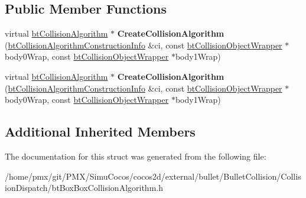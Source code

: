\subsection*{Public Member Functions}
\begin{DoxyCompactItemize}
\item 
\mbox{\label{structbtBoxBoxCollisionAlgorithm_1_1CreateFunc_a4fdd39591ef0d49a251b648b39a0c4bf}} 
virtual \hyperlink{classbtCollisionAlgorithm}{bt\+Collision\+Algorithm} $\ast$ {\bfseries Create\+Collision\+Algorithm} (\hyperlink{structbtCollisionAlgorithmConstructionInfo}{bt\+Collision\+Algorithm\+Construction\+Info} \&ci, const \hyperlink{structbtCollisionObjectWrapper}{bt\+Collision\+Object\+Wrapper} $\ast$body0\+Wrap, const \hyperlink{structbtCollisionObjectWrapper}{bt\+Collision\+Object\+Wrapper} $\ast$body1\+Wrap)
\item 
\mbox{\label{structbtBoxBoxCollisionAlgorithm_1_1CreateFunc_a4fdd39591ef0d49a251b648b39a0c4bf}} 
virtual \hyperlink{classbtCollisionAlgorithm}{bt\+Collision\+Algorithm} $\ast$ {\bfseries Create\+Collision\+Algorithm} (\hyperlink{structbtCollisionAlgorithmConstructionInfo}{bt\+Collision\+Algorithm\+Construction\+Info} \&ci, const \hyperlink{structbtCollisionObjectWrapper}{bt\+Collision\+Object\+Wrapper} $\ast$body0\+Wrap, const \hyperlink{structbtCollisionObjectWrapper}{bt\+Collision\+Object\+Wrapper} $\ast$body1\+Wrap)
\end{DoxyCompactItemize}
\subsection*{Additional Inherited Members}


The documentation for this struct was generated from the following file\+:\begin{DoxyCompactItemize}
\item 
/home/pmx/git/\+P\+M\+X/\+Simu\+Cocos/cocos2d/external/bullet/\+Bullet\+Collision/\+Collision\+Dispatch/bt\+Box\+Box\+Collision\+Algorithm.\+h\end{DoxyCompactItemize}
